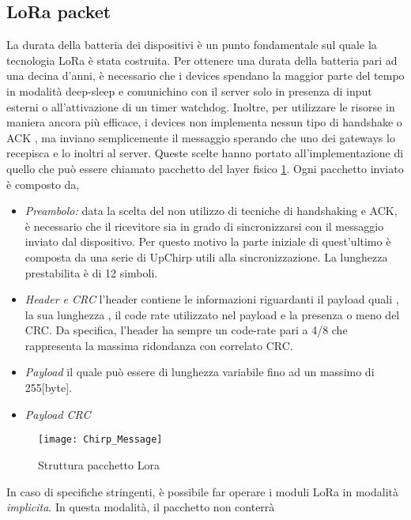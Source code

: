 \subsection{LoRa packet}
La durata della batteria dei dispositivi è un punto fondamentale sul quale la
tecnologia LoRa è stata costruita.  Per ottenere una durata della batteria pari
ad una decina d'anni, è necessario che i devices spendano la maggior parte del
tempo in modalità deep-sleep e comunichino con il server solo in presenza di
input esterni o all'attivazione di un timer watchdog.  Inoltre, per utilizzare
le risorse in maniera ancora più efficace, i devices non implementa nessun tipo
di handshake o ACK , ma inviano semplicemente il messaggio sperando che uno dei
gateways lo recepisca e lo inoltri al server.  Queste scelte hanno portato
all'implementazione di quello che può essere chiamato pacchetto del layer fisico
\ref{fig:phis_pack}.  Ogni pacchetto inviato è composto da,
\begin{itemize}
        \item   \emph{Preambolo:} data la scelta del non utilizzo di tecniche di
                handshaking e ACK, è necessario che il ricevitore sia in grado di
                sincronizzarsi con il messaggio inviato dal dispositivo. Per questo
                motivo la parte iniziale di quest'ultimo è composta da una serie di
                UpChirp utili alla sincronizzazione. La lunghezza prestabilita è di
                12 simboli.
        \item   \emph{Header e CRC} l'header contiene le informazioni riguardanti
                il payload quali , la sua lunghezza , il code rate utilizzato nel
                payload e la presenza o meno del CRC. Da specifica, l'header ha sempre
                un code-rate pari a 4/8 che rappresenta la massima ridondanza con
                correlato CRC. 
        \item   \emph{Payload} il quale può essere di lunghezza variabile fino ad
                un massimo di 255[byte].
        \item   \emph{Payload CRC}
\end{itemize}
\begin{figure}[h]
        \centering 
                \texttt{[image: Chirp\_Message]}
        \caption{Struttura pacchetto Lora }
        \label{fig:phis_pack}
\end{figure}
In caso di specifiche stringenti, è possibile far operare i moduli LoRa in
modalità \emph{implicita}. In questa modalità, il pacchetto non conterrà
